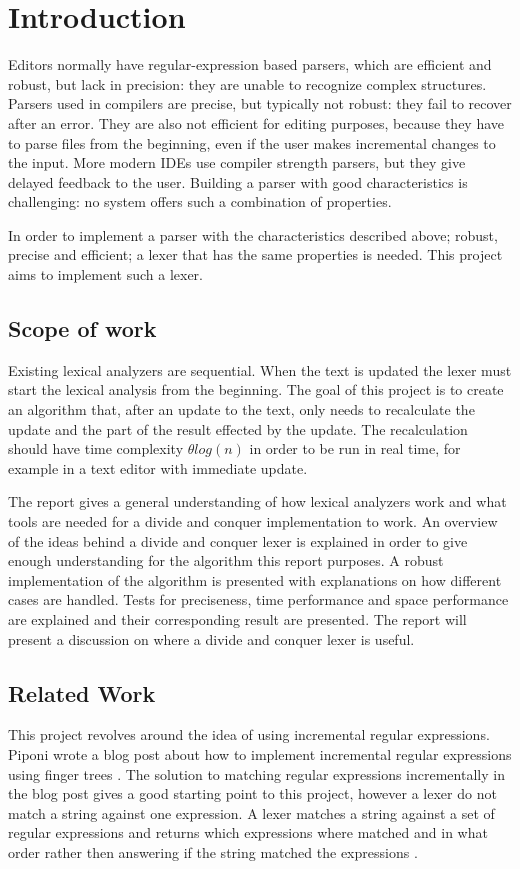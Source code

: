 \chapter{Introduction}
Editors normally have regular-expression based parsers, which are efficient and
robust, but lack in precision: they are unable to recognize complex structures.
Parsers used in compilers are precise, but typically not robust: they fail to
recover after an error. They are also not efficient for editing purposes,
because they have to parse files from the beginning, even if the user makes
incremental changes to the input. More modern IDEs use compiler strength
parsers, but they give delayed feedback to the user. Building a parser with good
characteristics is challenging: no system offers such a combination of
properties.

In order to implement a parser with the characteristics described above; robust,
precise and efficient; a lexer that has the same properties is needed. This
project aims to implement such a lexer.

\section{Scope of work}
Existing lexical analyzers are sequential. When the text is updated the lexer
must start the lexical analysis from the beginning. The goal of this project is
to create an algorithm that, after an update to the text, only needs to
recalculate the update and the part of the result effected by the update. The
recalculation should have time complexity $\theta log(n)$ in order to be run in
real time, for example in a text editor with immediate update.

The report gives a general understanding of how lexical analyzers work and what
tools are needed for a divide and conquer implementation to work. An overview of
the ideas behind a divide and conquer lexer is explained in order to give enough
understanding for the algorithm this report purposes. A robust implementation of
the algorithm is presented with explanations on how different cases are handled.
Tests for preciseness, time performance and space performance are explained and
their corresponding result are presented. The report will present a discussion
on where a divide and conquer lexer is useful.

\section{Related Work}
This project revolves around the idea of using incremental regular expressions.
Piponi wrote a blog post about how to implement incremental regular
expressions using finger trees \cite{blog}. The solution to matching regular expressions
incrementally in the blog post gives a good starting point to this project,
however a lexer do not match a string against one expression. A lexer matches a
string against a set of regular expressions and returns which expressions where
matched and in what order rather then answering if the string matched the
expressions \cite{blog}.

